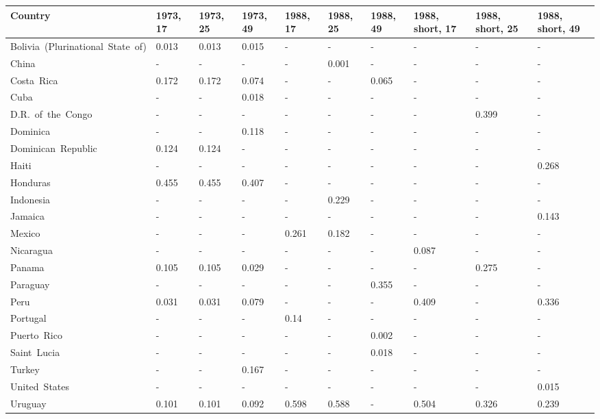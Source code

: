 \begin{table}[ht]
\centering
\begin{tabular}{llllllllll}
  \hline
Country & 1973, 17 & 1973, 25 & 1973, 49 & 1988, 17 & 1988, 25 & 1988, 49 & 1988, short, 17 & 1988, short, 25 & 1988, short, 49 \\ 
  \hline
Bolivia (Plurinational State of) & 0.013 & 0.013 & 0.015 & - & - & - & - & - & - \\ 
  China & - & - & - & - & 0.001 & - & - & - & - \\ 
  Costa Rica & 0.172 & 0.172 & 0.074 & - & - & 0.065 & - & - & - \\ 
  Cuba & - & - & 0.018 & - & - & - & - & - & - \\ 
  D.R. of the Congo & - & - & - & - & - & - & - & 0.399 & - \\ 
  Dominica & - & - & 0.118 & - & - & - & - & - & - \\ 
  Dominican Republic & 0.124 & 0.124 & - & - & - & - & - & - & - \\ 
  Haiti & - & - & - & - & - & - & - & - & 0.268 \\ 
  Honduras & 0.455 & 0.455 & 0.407 & - & - & - & - & - & - \\ 
  Indonesia & - & - & - & - & 0.229 & - & - & - & - \\ 
  Jamaica & - & - & - & - & - & - & - & - & 0.143 \\ 
  Mexico & - & - & - & 0.261 & 0.182 & - & - & - & - \\ 
  Nicaragua & - & - & - & - & - & - & 0.087 & - & - \\ 
  Panama & 0.105 & 0.105 & 0.029 & - & - & - & - & 0.275 & - \\ 
  Paraguay & - & - & - & - & - & 0.355 & - & - & - \\ 
  Peru & 0.031 & 0.031 & 0.079 & - & - & - & 0.409 & - & 0.336 \\ 
  Portugal & - & - & - & 0.14 & - & - & - & - & - \\ 
  Puerto Rico & - & - & - & - & - & 0.002 & - & - & - \\ 
  Saint Lucia & - & - & - & - & - & 0.018 & - & - & - \\ 
  Turkey & - & - & 0.167 & - & - & - & - & - & - \\ 
  United States & - & - & - & - & - & - & - & - & 0.015 \\ 
  Uruguay & 0.101 & 0.101 & 0.092 & 0.598 & 0.588 & - & 0.504 & 0.326 & 0.239 \\ 
   \hline
\end{tabular}
\end{table}
